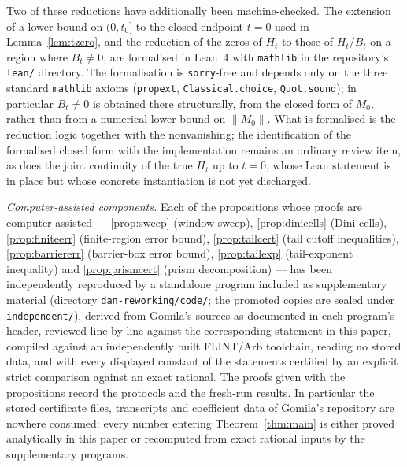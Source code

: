 \documentclass[11pt]{article}
\theoremstyle{definition}
\begin{document}
Two of these reductions have additionally been machine-checked. The
extension of a lower bound on $(0,t_0]$ to the closed endpoint
$t=0$ used in Lemma~\ref{lem:tzero}, and the reduction of the
zeros of $H_t$ to those of $H_t/B_t$ on a region where
$B_t\neq0$, are formalised in Lean~4 with \texttt{mathlib} in the
repository's \texttt{lean/} directory. The formalisation is
\texttt{sorry}-free and depends only on the three standard
\texttt{mathlib} axioms
(\texttt{propext}, \texttt{Classical.choice}, \texttt{Quot.sound});
in particular $B_t\neq0$ is obtained there structurally, from the
closed form of $M_0$, rather than from a numerical lower bound on
$\lVert M_0\rVert$. What is formalised is the reduction logic
together with the nonvanishing; the identification of the
formalised closed form with the implementation remains an ordinary
review item, as does the joint continuity of the true $H_t$ up to
$t=0$, whose Lean statement is in place but whose concrete
instantiation is not yet discharged.

\emph{Computer-assisted components.} Each of the 
propositions whose proofs are computer-assisted --- \ref{prop:sweep} (window sweep),
\ref{prop:dinicells} (Dini cells), \ref{prop:finiteerr}
(finite-region error bound), \ref{prop:tailcert} (tail cutoff
inequalities), \ref{prop:barriererr} (barrier-box error bound),
\ref{prop:tailexp} (tail-exponent inequality) and
\ref{prop:prismcert} (prism decomposition) --- has been
independently reproduced by a standalone program included as
supplementary material (directory \texttt{dan-reworking/code/}; the promoted copies are sealed under \texttt{independent/}), derived from
Gomila's sources as documented in each program's header, reviewed
line by line against the corresponding statement in this paper,
compiled against an independently built FLINT/Arb toolchain,
reading no stored data, and with every displayed constant of the
statements certified by an explicit strict comparison against an
exact rational. The proofs given with the propositions record the
protocols and the fresh-run results. In particular the stored
certificate files, transcripts and coefficient data of Gomila's
repository are nowhere consumed: every number entering
Theorem~\ref{thm:main} is either proved analytically in this paper
or recomputed from exact rational inputs by the supplementary
programs.
\end{document}
